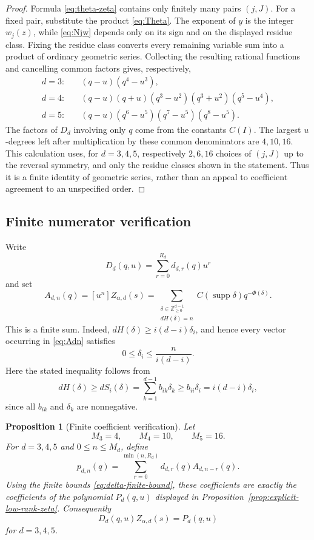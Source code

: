 \documentclass[11pt]{amsart}
\newcommand{\ZZ}{\mathbb Z}
\newcommand{\supp}{\operatorname{supp}}
\theoremstyle{plain}
\newtheorem{proposition}[theorem]{Proposition}
\theoremstyle{definition}
\numberwithin{equation}{section}
\begin{document}
\begin{appendix}
\begin{proof}
Formula \eqref{eq:theta-zeta} contains only finitely many pairs \((j,J)\).  For a fixed
pair, substitute the product \eqref{eq:Theta}.  The exponent of \(y\) is the integer
\(w_j(z)\), while \eqref{eq:Njw} depends only on its sign and on the displayed residue
class.  Fixing the residue class converts every remaining variable sum into a product of
ordinary geometric series.  Collecting the resulting rational functions and cancelling
common factors gives, respectively,
\begin{align*}
d=3:\quad&
(q-u)(q^4-u^3),\\
d=4:\quad&
(q-u)(q+u)(q^3-u^2)(q^3+u^2)(q^5-u^4),\\
d=5:\quad&
(q-u)(q^6-u^5)(q^7-u^5)(q^8-u^5).
\end{align*}
The factors of \(D_d\) involving only \(q\) come from the constants \(C(I)\).
The largest \(u\)-degrees left after multiplication by these common denominators are
\(4,10,16\).  This calculation uses, for \(d=3,4,5\), respectively \(2,6,16\) choices
of \((j,J)\) up to the reversal symmetry, and only the residue classes shown in the
statement.  Thus it is a finite identity of geometric series, rather than an appeal to
coefficient agreement to an unspecified order.
\end{proof}

\subsection{Finite numerator verification}

Write
\[
  D_d(q,u)=\sum_{r=0}^{R_d}d_{d,r}(q)u^r
\]
and set
\begin{equation}\label{eq:Adn}
  A_{d,n}(q)
  =
  [u^n]Z_{\alpha,d}(s)
  =
  \sum_{\substack{\delta\in\ZZ_{\ge0}^{d-1}\\dH(\delta)=n}}
  C(\supp\delta)q^{-\Phi(\delta)}.
\end{equation}
This is a finite sum.  Indeed, \(dH(\delta)\ge i(d-i)\delta_i\), and hence every vector
occurring in \eqref{eq:Adn} satisfies
\begin{equation}\label{eq:delta-finite-bound}
  0\le\delta_i\le\frac{n}{i(d-i)}.
\end{equation}
Here the stated inequality follows from
\[
  dH(\delta)\ge dS_i(\delta)
  =\sum_{k=1}^{d-1}b_{ik}\delta_k
  \ge b_{ii}\delta_i=i(d-i)\delta_i,
\]
since all \(b_{ik}\) and \(\delta_k\) are nonnegative.

\begin{proposition}[Finite coefficient verification]\label{prop:finite-coefficient-verification}
Let
\[
  M_3=4,\qquad M_4=10,\qquad M_5=16.
\]
For \(d=3,4,5\) and \(0\le n\le M_d\), define
\begin{equation}\label{eq:pd-coefficient}
  p_{d,n}(q)
  =
  \sum_{r=0}^{\min(n,R_d)}d_{d,r}(q)A_{d,n-r}(q).
\end{equation}
Using the finite bounds \eqref{eq:delta-finite-bound}, these coefficients are exactly the
coefficients of the polynomial \(P_d(q,u)\) displayed in
Proposition~\ref{prop:explicit-low-rank-zeta}.  Consequently
\[
  D_d(q,u)Z_{\alpha,d}(s)=P_d(q,u)
\]
for \(d=3,4,5\).
\end{proposition}


\end{appendix}
\end{document}
